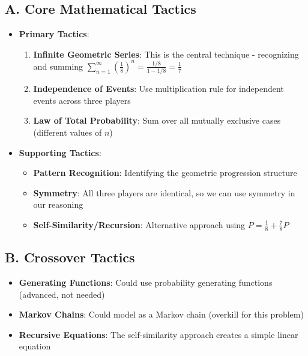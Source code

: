 \documentclass[11pt]{article}
\begin{document}
\begin{tacticalbox}
\subsection*{A. Core Mathematical Tactics}
\begin{itemize}[leftmargin=*]
    \item \textbf{Primary Tactics}:
    \begin{enumerate}
        \item \textbf{Infinite Geometric Series}: This is the central technique - recognizing and summing $\sum_{n=1}^{\infty} \left(\frac{1}{8}\right)^n = \frac{1/8}{1-1/8} = \frac{1}{7}$
        \item \textbf{Independence of Events}: Use multiplication rule for independent events across three players
        \item \textbf{Law of Total Probability}: Sum over all mutually exclusive cases (different values of $n$)
    \end{enumerate}
    
    \item \textbf{Supporting Tactics}:
    \begin{itemize}
        \item \textbf{Pattern Recognition}: Identifying the geometric progression structure
        \item \textbf{Symmetry}: All three players are identical, so we can use symmetry in our reasoning
        \item \textbf{Self-Similarity/Recursion}: Alternative approach using $P = \frac{1}{8} + \frac{7}{8}P$
    \end{itemize}
\end{itemize}

\subsection*{B. Crossover Tactics}
\begin{itemize}[leftmargin=*]
    \item \textbf{Generating Functions}: Could use probability generating functions (advanced, not needed)
    \item \textbf{Markov Chains}: Could model as a Markov chain (overkill for this problem)
    \item \textbf{Recursive Equations}: The self-similarity approach creates a simple linear equation
\end{itemize}


\end{tacticalbox}
\end{document}
